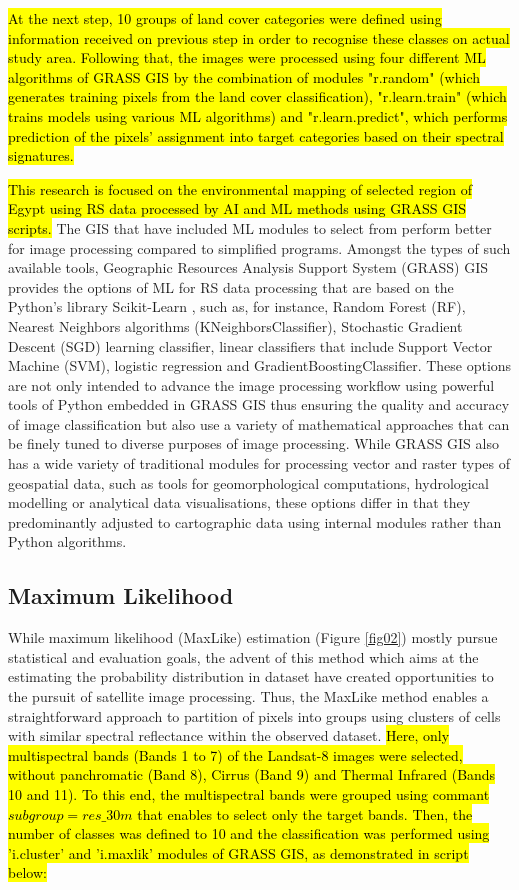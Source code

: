 \documentclass[final,5p,times,twocolumn]{elsarticle}
\begin{document}
\hl{At the next step, 10 groups of land cover categories were defined using information received on previous step in order to recognise these classes on actual study area. Following that, the images were processed using four different ML algorithms of GRASS GIS by the combination of modules "r.random" (which generates training pixels from the land cover classification), "r.learn.train" (which trains models using various ML algorithms) and "r.learn.predict", which performs prediction of the pixels' assignment into target categories based on their spectral signatures.}

\hl{This research is focused on the environmental mapping of selected region of Egypt using RS data processed by AI and ML methods using GRASS GIS scripts. }The GIS that have included ML modules to select from perform better for image processing compared to simplified programs. Amongst the types of such available tools, Geographic Resources Analysis Support System (GRASS) GIS provides the options of ML for RS data processing that are based on the Python's library Scikit-Learn \cite{scikitlearn}, such as, for instance, Random Forest (RF), Nearest Neighbors algorithms (KNeighborsClassifier), Stochastic Gradient Descent (SGD) learning classifier, linear classifiers that include Support Vector Machine (SVM), logistic regression and GradientBoostingClassifier. These options are not only intended to advance the image processing workflow using powerful tools of Python embedded in GRASS GIS thus ensuring the quality and accuracy of image classification but also use a variety of mathematical approaches that can be finely tuned to diverse purposes of image processing. While GRASS GIS also has a wide variety of traditional modules for processing vector and raster types of geospatial data, such as tools for geomorphological computations, hydrological modelling or analytical data visualisations, these options differ in that they predominantly adjusted to cartographic data using internal modules rather than Python algorithms. 

\subsection{Maximum Likelihood}
While maximum likelihood (MaxLike) estimation (Figure \ref{fig02}) mostly pursue statistical and evaluation goals, the advent of this method which aims at the estimating the probability distribution in dataset have created opportunities to the pursuit of satellite image processing. Thus, the MaxLike method enables a straightforward approach to partition of pixels into groups using clusters of cells with similar spectral reflectance within the observed dataset. \hl{Here, only multispectral bands (Bands 1 to 7) of the Landsat-8 images were selected, without panchromatic (Band 8), Cirrus (Band 9) and Thermal Infrared  (Bands 10 and 11). To this end, the multispectral bands were grouped using commant $subgroup=res\_30m$ that enables to select only the target bands. Then, the number of classes was defined to 10 and the classification was performed using 'i.cluster' and 'i.maxlik' modules of GRASS GIS, as demonstrated in script below: }
\end{document}
